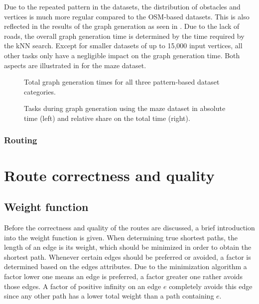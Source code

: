 			Due to the repeated pattern in the datasets, the distribution of obstacles and vertices is much more regular compared to the OSM-based datasets.
			This is also reflected in the results of the graph generation as seen in .
			Due to the lack of roads, the overall graph generation time is determined by the time required by the kNN search.
			Except for smaller datasets of up to 15,000 input vertices, all other tasks only have a negligible impact on the graph generation time.
			Both aspects are illustrated in  for the maze dataset.
			
			\begin{figure}[h!]
				\begin{figcenter}
					
				\end{figcenter}
				\caption{Total graph generation times for all three pattern-based dataset categories.}
				\label{fig:eval-import-pattern-abs}
			\end{figure}
			
			\begin{figure}[h!]
				\begin{figcenter}
					
				\end{figcenter}
				\caption{Tasks during graph generation using the maze dataset in absolute time (left) and relative share on the total time (right).}
				\label{fig:eval-import-pattern-maze-abs-rel}
			\end{figure}
		
		\subsubsection{Routing}
		
\section{Route correctness and quality}

	\subsection{Weight function}
	
		Before the correctness and quality of the routes are discussed, a brief introduction into the weight function is given.
		When determining true shortest paths, the length of an edge is its weight, which should be minimized in order to obtain the shortest path.
		Whenever certain edges should be preferred or avoided, a factor is determined based on the edges attributes.
		Due to the minimization algorithm a factor lower one means an edge is preferred, a factor greater one rather avoids those edges.
		A factor of positive infinity on an edge $e$ completely avoids this edge since any other path has a lower total weight than a path containing $e$.
		
